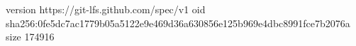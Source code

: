 version https://git-lfs.github.com/spec/v1
oid sha256:0fe5dc7ac1779b05a5122e9e469d36a630856e125b969e4dbc8991fce7b2076a
size 174916
